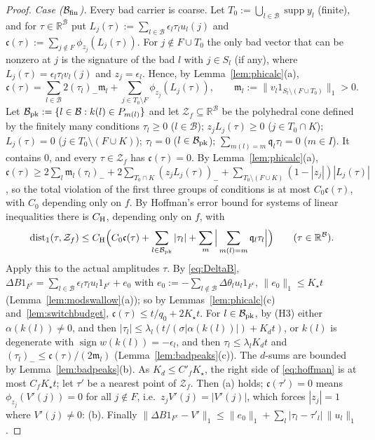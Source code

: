 \documentclass[10pt]{amsart}
\theoremstyle{definition}
\theoremstyle{remark}
\newcommand{\supp}{\operatorname{supp}}
\newcommand{\sgn}{\operatorname{sign}}
\newcommand{\dist}{\operatorname{dist}}
\newcommand{\R}{\mathbb R}
\begin{document}
\begin{proof}
\emph{Case ($\mathcal B_{\rm fin}$).}  Every bad carrier is coarse.  Let $T_0:=\bigcup_{l\in\mathcal B}\supp y_l$ (finite), and for
$\tau\in\R^{\mathcal B}$ put $L_j(\tau):=\sum_{l\in\mathcal B}\epsilon_l
\tau_lu_l(j)$ and $\mathfrak c(\tau):=\sum_{j\notin F}\phi_{z_j}(L_j(\tau))$.
For $j\notin F\cup T_0$ the only bad vector that can be nonzero at $j$ is
the signature of the bad $l$ with $j\in S_l$ (if any), where
$L_j(\tau)=\epsilon_l\tau_lv_l(j)$ and $z_j=\epsilon_l$.  Hence, by
Lemma~\ref{lem:phicalc}(a),
\[
 \mathfrak c(\tau)=\sum_{l\in\mathcal B}2(\tau_l)_-\mathfrak m_l+\sum_{j\in
 T_0\setminus F}\phi_{z_j}(L_j(\tau)),\qquad\mathfrak m_l:=\|v_l1_{S_l
 \setminus(F\cup T_0)}\|_1>0 .
\]
Let $\mathcal B_{\rm pk}:=\{l\in\mathcal B:k(l)\in P_{m(l)}\}$ and let
$\mathcal Z_f\subseteq\R^{\mathcal B}$ be the polyhedral cone defined by
the finitely many conditions $\tau_l\ge0$ ($l\in\mathcal B$);
$z_jL_j(\tau)\ge0$ ($j\in T_0\cap K$); $L_j(\tau)=0$ ($j\in T_0\setminus
(F\cup K)$); $\tau_l=0$ ($l\in\mathcal B_{\rm pk}$); $\sum_{m(l)=m}
\mathfrak q_l\tau_l=0$ ($m\in I$).  It contains $0$, and every
$\tau\in\mathcal Z_f$ has $\mathfrak c(\tau)=0$.  By
Lemma~\ref{lem:phicalc}(a), $\mathfrak c(\tau)\ge2\sum_l\mathfrak m_l
(\tau_l)_-+2\sum_{T_0\cap K}(z_jL_j(\tau))_-+\sum_{T_0\setminus(F\cup K)}
(1-|z_j|)|L_j(\tau)|$, so the total violation of the first three groups
of conditions is at most $C_0\mathfrak c(\tau)$, with $C_0$ depending only
on $f$.  By Hoffman's error bound for systems of linear inequalities
\cite{Hoffman} there is $C_{\rm H}$, depending only on $f$, with
\begin{equation}\label{eq:hoffman}
 \dist_1(\tau,\mathcal Z_f)\le C_{\rm H}\Big(C_0\mathfrak c(\tau)+
 \sum_{l\in\mathcal B_{\rm pk}}|\tau_l|+\sum_m\Big|\sum_{m(l)=m}\mathfrak
 q_l\tau_l\Big|\Big)\qquad(\tau\in\R^{\mathcal B}).
\end{equation}
Apply this to the actual amplitudes $\tau$.  By \eqref{eq:DeltaB},
$\Delta B1_{F^c}=\sum_{l\in\mathcal B}\epsilon_l\tau_lu_l1_{F^c}+e_0$ with
$e_0:=-\sum_{l\notin\mathcal B}\Delta\theta_lu_l1_{F^c}$, $\|e_0\|_1\le
K_\star t$ (Lemma~\ref{lem:modswallow}(a)); so by Lemmas~\ref{lem:phicalc}(c)
and~\ref{lem:switchbudget}, $\mathfrak c(\tau)\le t/q_0+2K_\star t$.  For
$l\in\mathcal B_{\rm pk}$, by (H3) either $\alpha(k(l))\ne0$, and then
$|\tau_l|\le\lambda_l(t/(\sigma|\alpha(k(l))|)+K_dt)$, or $k(l)$ is
degenerate with $\sgn w(k(l))=-\epsilon_l$, and then $\tau_l\le
\lambda_lK_dt$ and $(\tau_l)_-\le\mathfrak c(\tau)/(2\mathfrak m_l)$
(Lemma~\ref{lem:badpeaks}(c)).  The $d$-sums are bounded by
Lemma~\ref{lem:badpeaks}(b).  As $K_d\le C'_fK_\star$, the right side of
\eqref{eq:hoffman} is at most $C_fK_\star t$; let $\tau'$ be a nearest point
of $\mathcal Z_f$.  Then (a) holds; $\mathfrak c(\tau')=0$ means
$\phi_{z_j}(V'(j))=0$ for all $j\notin F$, i.e.\ $z_jV'(j)=|V'(j)|$, which
forces $|z_j|=1$ where $V'(j)\ne0$: (b).  Finally $\|\Delta B1_{F^c}-V'\|_1\le
\|e_0\|_1+\sum_l|\tau_l-\tau'_l|\,\|u_l\|_1$.
\end{proof}
\end{document}
